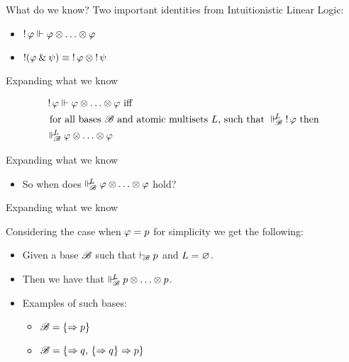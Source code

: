 \documentclass{beamer}
\begin{document}
\begin{frame}{What do we know?}
	Two important identities from Intuitionistic Linear Logic:
	\begin{itemize}
	\item $\mathop{!}\varphi \Vdash_{ \!\! }^{ \!\! } \varphi \otimes \ldots \otimes \varphi$
	\item $\mathop{!}(\varphi\mathbin{\&}\psi)\equiv\mathop{!}\varphi\otimes\mathop{!}\psi$
	\end{itemize}
\end{frame}
\begin{frame}{Expanding what we know}
	\begin{center}
	\begin{align*}
	&\bang\varphi \suppM{}{} \varphi \mand \ldots \mand \varphi \text{ iff } \\
	&\text{ for all bases } \baseB \text{ and atomic multisets } \at{L} \text{, such that } \suppM{\baseB}{\at{L}} \bang\varphi \text{ then } \\ 
	&\suppM{\baseB}{\at{L}} \varphi \mand \ldots \mand \varphi
	\end{align*}
	\end{center}
\end{frame}
\begin{frame}{Expanding what we know}
	\begin{center}
	\begin{itemize}
	\item So when does $\Vdash_{ \!\!\mathscr{B} }^{ \!\!{L} } \varphi \otimes \ldots \otimes \varphi$ hold?
	\end{itemize}
	\end{center}
\end{frame}
\begin{frame}{Expanding what we know}
	\begin{center}
	Considering the case when $\varphi = {p}$ for simplicity we get the following:
	\begin{itemize}
	\pause
	\item Given a base $\mathscr{B}$ such that $\vdash_{\!\!\mathscr{B}}{p}$ and ${L}=\varnothing$.
	\pause
	\item Then we have that $\Vdash_{ \!\!\mathscr{B} }^{ \!\!{L} }{p} \otimes \ldots \otimes {p}$.
	\pause
	\item Examples of such bases:
	\begin{itemize}
		\item $\mathscr{B} = \{\Rightarrow p\}$
		\item $\mathscr{B} = \{\Rightarrow q,\, \{\Rightarrow q\}\Rightarrow p\}$
	\end{itemize}
	\end{itemize}
	\vspace{10pt}
	\end{center}
\end{frame}
\end{document}
